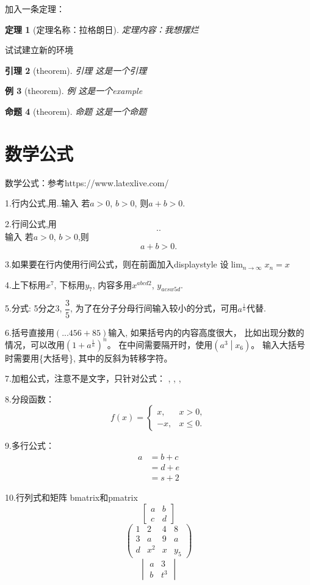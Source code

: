 \documentclass[12pt,a4paper,oneside]{ctexart}
\newtheorem{theorem}{定理}[section]
\newtheorem{lemma}[theorem]{引理}
\newtheorem{example}[theorem]{例}
\newtheorem{proposition}[theorem]{命题}
\begin{document}
加入一条定理：
\begin{theorem}[定理名称：拉格朗日]
    定理内容：我想摆烂
\end{theorem}

试试建立新的环境
\begin{lemma}[theorem]{引理}
    这是一个引理
\end{lemma}
\begin{example}[theorem]{例}
    这是一个example
\end{example}
\begin{proposition}[theorem]{命题}
    这是一个命题
\end{proposition}

\section{数学公式}

数学公式：参考https://www.latexlive.com/

1.行内公式,用$..$输入
若$a>0$, $b>0$, 则$a+b>0$.

2.行间公式,用$$..$$输入
若$a>0$, $b>0$,则
$$
a+b>0.
$$

3.如果要在行内使用行间公式，则在前面加入displaystyle
设$\displaystyle\lim_{n\to\infty}x_n=x$

4.上下标用$x^7$, 下标用$y_7$,  内容多用$x^{abcd2}$, $y_{acsw5d}$.

5.分式: 5分之3, $\dfrac{3}{5}$, 
为了在分子分母行间输入较小的分式，可用$a^\frac{1}{n}$代替.

6.括号直接用$(...456+85)$输入, 如果括号内的内容高度很大，
比如出现分数的情况，可以改用$\left(1+a^\frac{1}{n}\right)^n$。
在中间需要隔开时，使用$\left(a^3\middle|x_6\right)$。
输入大括号时需要用\{大括号\}, 其中的反斜为转移字符。

7.加粗公式，注意不是文字，只针对公式： , , \textsl{}, \textsl{}

8.分段函数：
$$
f(x)=\begin{cases}
    x, & x>0, \\
    -x, & x\leq 0.
\end{cases}
$$

9.多行公式：
$$
\begin{aligned}
    a & =b+c \\
    & =d+e \\
    & = s+2
\end{aligned}
$$

10.行列式和矩阵 bmatrix和pmatrix
$$
\begin{bmatrix}
    a & b \\
    c & d  
\end{bmatrix}
$$
$$
\begin{pmatrix}
    1&2&4&8 \\
    3&a&9&a \\
    d&x^2&x&y_5
\end{pmatrix}
$$
$$
\begin{vmatrix}
    a&3 \\
    b&t^3
\end{vmatrix}
$$
\end{document}
